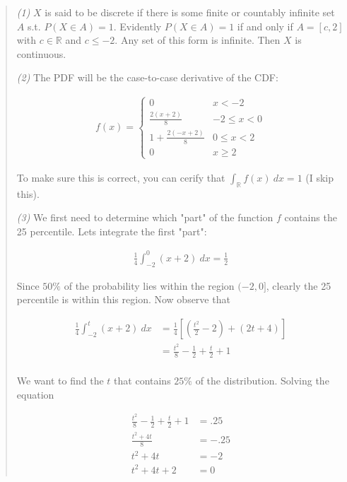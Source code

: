 \documentclass[a4paper, 12pt]{article}
\begin{document}
\small
\begin{quote}

\textit{(1)} $X$ is said to be discrete if there is some finite or countably infinite set $A$
s.t. $P(X \in A) = 1$. Evidently $P(X \in A) = 1$ if and only if $A =  \left[
    c,
2\right] $ with $c \in \mathbb{R}$ and $c \leq -2$. Any set of this form is
infinite. Then $X$ is continuous. 

\textit{(2)} The PDF will be the case-to-case derivative of the CDF: 

\begin{align*}
    f(x) = \begin{cases}
        0 & x < - 2 \\
        \frac{2(x+2)}{8} & -2 \leq x < 0 \\ 
        1 + \frac{ 2(-x+2) }{8} & 0 \leq x < 2 \\ 
        0 & x \geq 2
    \end{cases}
\end{align*}

To make sure this is correct, you can cerify that $\int_{\mathbb{R}}f(x) ~ dx =
1$ (I skip this). 

\textit{(3)} We first need to determine which "part" of the function $f$
contains the 25 percentile. Lets integrate the first "part": 

\begin{align*}
    \frac{1}{4}\int_{-2}^{0}(x+2) ~ dx = \frac{1}{2}
\end{align*}

Since $50\%$ of the probability lies within the region $(-2, 0]$, clearly the 25
percentile is within this region. Now observe that

\begin{align*}
    \frac{1}{4} \int_{-2}^{t}(x+2) ~ dx &= \frac{1}{4}\left[ \left(\frac{t^2}{2}
            - 2\right)
    + \left( 2t + 4  \right) \right]  \\ 
                                        &= \frac{t^2}{8}-\frac{1}{2} +
                                        \frac{t}{2} + 1 \\ 
\end{align*}

We want to find the $t$ that contains $25\%$ of the distribution. Solving the
equation 

\begin{align*}
    \frac{t^2}{8} - \frac{1}{2} + \frac{t}{2} + 1 &= .25  \\ 
    \frac{t^2 + 4t}{8} &= -.25 \\ 
    t^2 + 4t &= -2 \\ 
    t^2 + 4t + 2 &= 0
\end{align*}


\end{quote}
\end{document}
